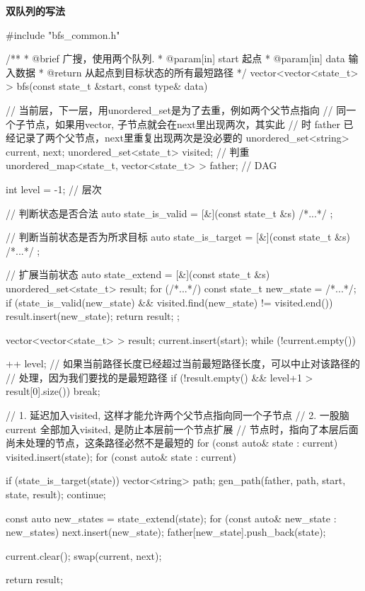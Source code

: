 \textbf{双队列的写法}

\begin{Codex}[label=bfs_template.cpp]
#include "bfs_common.h"

/**
 * @brief 广搜，使用两个队列.
 * @param[in] start 起点
 * @param[in] data 输入数据
 * @return 从起点到目标状态的所有最短路径
 */
vector<vector<state_t> > bfs(const state_t &start, const type& data) {
    // 当前层，下一层，用unordered_set是为了去重，例如两个父节点指向
    // 同一个子节点，如果用vector, 子节点就会在next里出现两次，其实此
    // 时 father 已经记录了两个父节点，next里重复出现两次是没必要的
    unordered_set<string> current, next;
    unordered_set<state_t> visited; // 判重
    unordered_map<state_t, vector<state_t> > father; // DAG

    int level = -1;  // 层次

    // 判断状态是否合法
    auto state_is_valid = [&](const state_t &s) { /*...*/ };

    // 判断当前状态是否为所求目标
    auto state_is_target = [&](const state_t &s) { /*...*/ };

    // 扩展当前状态
    auto state_extend = [&](const state_t &s) {
        unordered_set<state_t> result;
        for (/*...*/) {
            const state_t new_state = /*...*/;
            if (state_is_valid(new_state) && 
                    visited.find(new_state) != visited.end()) {
                result.insert(new_state);
            }
        }
        return result;
    };

    vector<vector<state_t> > result;
    current.insert(start);
    while (!current.empty()) {
        ++ level;
        // 如果当前路径长度已经超过当前最短路径长度，可以中止对该路径的
        // 处理，因为我们要找的是最短路径
        if (!result.empty() && level+1 > result[0].size()) break;

        // 1. 延迟加入visited, 这样才能允许两个父节点指向同一个子节点
        // 2. 一股脑current 全部加入visited, 是防止本层前一个节点扩展
        // 节点时，指向了本层后面尚未处理的节点，这条路径必然不是最短的
        for (const auto& state : current)
            visited.insert(state);
        for (const auto& state : current) {
            if (state_is_target(state)) {
                vector<string> path;
                gen_path(father, path, start, state, result);
                continue;
            }

            const auto new_states = state_extend(state);
            for (const auto& new_state : new_states) {
                next.insert(new_state);
                father[new_state].push_back(state);
            }
        }

        current.clear();
        swap(current, next);
    }

    return result;
}
\end{Codex}

